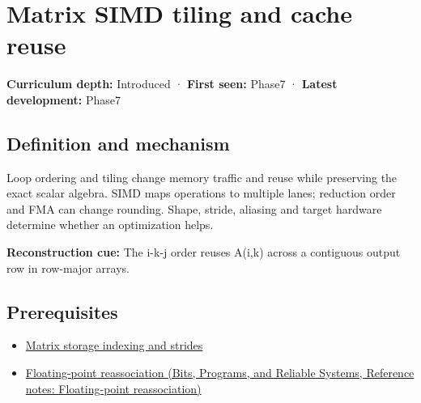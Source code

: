 \hypertarget{appendix-1bfb7c657105}{}\label{referencestart:appendix-1bfb7c657105}
\section{Matrix SIMD tiling and cache reuse}\label{appendix-1bfb7c657105-matrix-simd-tiling-and-cache-reuse}

\hypertarget{appendix-1bfb7c657105-matrix-simd-tiling-and-cache-reuse}{}

\textbf{Curriculum depth:} Introduced · \textbf{First seen:} Phase7 · \textbf{Latest development:} Phase7

\begin{allmightroledefinition}

\subsection{Definition and mechanism}\label{appendix-1bfb7c657105-definition-and-mechanism}

\hypertarget{appendix-1bfb7c657105-definition-and-mechanism}{}

Loop ordering and tiling change memory traffic and reuse while preserving the exact scalar algebra. SIMD maps operations to multiple lanes; reduction order and FMA can change rounding. Shape, stride, aliasing and target hardware determine whether an optimization helps.

\end{allmightroledefinition}

\textbf{Reconstruction cue:} The i-k-j order reuses A(i,k) across a contiguous output row in row-major arrays.

\subsection{Prerequisites}\label{appendix-1bfb7c657105-prerequisites}

\hypertarget{appendix-1bfb7c657105-prerequisites}{}

\begin{itemize}
\tightlist
\item
  \hyperref[appendix-ffdc1d4e5350]{Matrix storage indexing and strides}
\item
  \href{../01-Bits-Programs-and-Reliable-Systems/main.pdf\#nameddest=appendix-c2ac4a84c283}{Floating-point reassociation (Bits, Programs, and Reliable Systems, Reference notes: Floating-point reassociation)}
\end{itemize}

